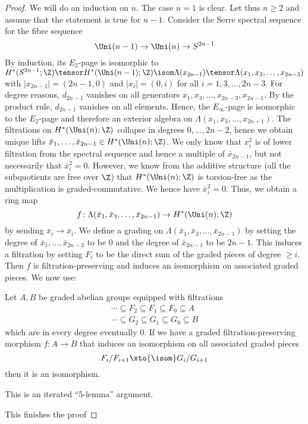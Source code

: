 \documentclass[wip, topology]{bsteffan-lecturenotes}
\begin{document}
\begin{proof}
	We will do an induction on $n$.
	The case $n = 1$ is clear.
	Let thus $n \geq 2$ and assume that the statement is true for $n - 1$.
	Consider the Serre spectral sequence for the fibre sequence
	\begin{equation*}
		\Uni(n - 1) \to \Uni(n) \to S^{2n - 1}
	\end{equation*}
	By induction, its $E_2$-page is isomorphic to $H^*(S^{2n - 1}; \Z) \tensor H^*(\Uni(n - 1); \Z) \isom \Lambda(x_{2n - 1}) \tensor \Lambda(x_1, x_3, \ldots, x_{2n - 3})$ with $|x_{2n - 1}| = (2n - 1, 0)$ and $|x_i| = (0, i)$ for all $i = 1, 3, \ldots, 2n - 3$.
	For degree reasons, $d_{2n - 1}$ vanishes on all generators $x_1, x_3, \ldots, x_{2n - 3}, x_{2n - 1}$.
	By the product rule, $d_{2n - 1}$ vanishes on all elements.
	Hence, the $E_\infty$-page is isomorphic to the $E_2$-page and therefore an exterior algebra on $\Lambda(x_1, x_3, \ldots, x_{2n - 1})$.
	The filtrations on $H^*(\Uni(n); \Z)$ collapse in degrees $0, \ldots, 2n - 2$, hence we obtain unique lifts $\bar{x}_1, \ldots, \bar{x}_{2n - 1} \in H^*(\Uni(n); \Z)$.
	We only know that $x_i^2$ is of lower filtration from the spectral sequence and hence a multiple of $\bar{x}_{2n - 1}$, but not necessarily that $\bar{x}_i^2 = 0$.
	However, we know from the additive structure (all the subquotients are free over $\Z$) that $H^*(\Uni(n); \Z)$ is torsion-free as the multiplication is graded-commutative.
	We hence have $\bar{x}_i^2 = 0$.
	Thus, we obtain a ring map
	\begin{equation*}
		f\colon \Lambda(\bar{x}_1, \bar{x}_3, \ldots, \bar{x}_{2n - 1}) \to H^*(\Uni(n); \Z)
	\end{equation*}
	by sending $\bar{x}_i \to \bar{x}_i$.
	We define a grading on $\Lambda(\bar{x}_1, \bar{x}_3, \ldots, \bar{x}_{2n - 1})$ by setting the degree of $\bar{x}_1, \ldots, \bar{x}_{2n - 3}$ to be 0 and the degree of $\bar{x}_{2n - 1}$ to be $2n - 1$.
	This induces a filtration by setting $F_i$ to be the direct sum of the graded pieces of degree $\geq i$. 
	Then $f$ is filtration-preserving and induces an isomorphism on associated graded pieces.
	We now use:
	\begin{lemma}
		Let $A, B$ be graded abelian groups equipped with filtrations
		\begin{gather*}
			\cdots \subseteq F_2 \subseteq F_1 \subseteq F_0 \subseteq A \\
			\cdots \subseteq G_2 \subseteq G_1 \subseteq G_0 \subseteq B
		\end{gather*}
		which are in every degree eventually 0.
		If we have a graded filtration-preserving morphism $f\colon A \to B$ that induces an isomorphism on all associated graded pieces
		\begin{equation*}
			F_i / F_{i + 1} \xto{\isom} G_i / G_{i + 1}
		\end{equation*}
		then it is an isomorphism.
	\end{lemma}
	\begin{smallproof}
		This is an iterated \enquote{5-lemma} argument.
	\end{smallproof}
	This finishes the proof
\end{proof}
\end{document}
